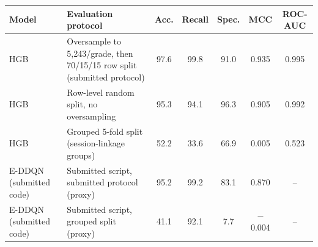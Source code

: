 \begin{tabular}{llccccc}
\toprule
Model & Evaluation protocol & Acc. & Recall & Spec. & MCC & ROC-AUC \\
\midrule
HGB & Oversample to 5,243/grade, then 70/15/15 row split (submitted protocol) & 97.6 & 99.8 & 91.0 & 0.935 & 0.995 \\
HGB & Row-level random split, no oversampling & 95.3 & 94.1 & 96.3 & 0.905 & 0.992 \\
HGB & Grouped 5-fold split (session-linkage groups) & 52.2 & 33.6 & 66.9 & 0.005 & 0.523 \\
E-DDQN (submitted code) & Submitted script, submitted protocol (proxy) & 95.2 & 99.2 & 83.1 & 0.870 & -- \\
E-DDQN (submitted code) & Submitted script, grouped split (proxy) & 41.1 & 92.1 & 7.7 & $-$0.004 & -- \\
\bottomrule
\end{tabular}
